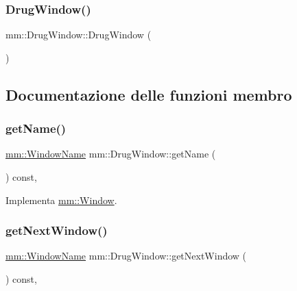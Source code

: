 \subsubsection{\texorpdfstring{Drug\+Window()}{DrugWindow()}}
{\footnotesize\ttfamily mm\+::\+Drug\+Window\+::\+Drug\+Window (\begin{DoxyParamCaption}{ }\end{DoxyParamCaption})}



\subsection{Documentazione delle funzioni membro}
\mbox{\label{classmm_1_1_drug_window_aa33aafc6205abc8c627d0b0a5849895b}} 
\subsubsection{\texorpdfstring{get\+Name()}{getName()}}
{\footnotesize\ttfamily \mbox{\hyperlink{namespacemm_a4e9d92e04f65dbf2fc1963947da0d93c}{mm\+::\+Window\+Name}} mm\+::\+Drug\+Window\+::get\+Name (\begin{DoxyParamCaption}{ }\end{DoxyParamCaption}) const\hspace{0.3cm}{\ttfamily [override]}, {\ttfamily [virtual]}}



Implementa \mbox{\hyperlink{classmm_1_1_window_a942c9125bf42156a9f7b7f561e412fed}{mm\+::\+Window}}.

\mbox{\label{classmm_1_1_drug_window_a571966bdd4a2ecf069cdca69c73726b2}} 
\subsubsection{\texorpdfstring{get\+Next\+Window()}{getNextWindow()}}
{\footnotesize\ttfamily \mbox{\hyperlink{namespacemm_a4e9d92e04f65dbf2fc1963947da0d93c}{mm\+::\+Window\+Name}} mm\+::\+Drug\+Window\+::get\+Next\+Window (\begin{DoxyParamCaption}{ }\end{DoxyParamCaption}) const\hspace{0.3cm}{\ttfamily [override]}, {\ttfamily [virtual]}}



